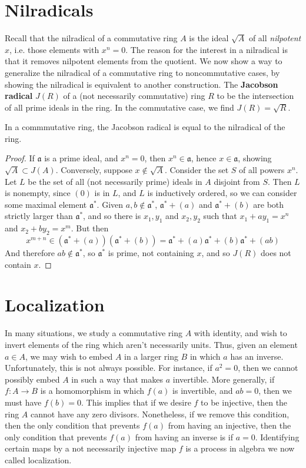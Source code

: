 \section{Nilradicals}

Recall that the nilradical of a commutative ring $A$ is the ideal $\sqrt{A}$ of all {\it nilpotent} $x$, i.e. those elements with $x^n = 0$. The reason for the interest in a nilradical is that it removes nilpotent elements from the quotient. We now show a way to generalize the nilradical of a commutative ring to noncommutative cases, by showing the nilradical is equivalent to another construction. The {\bf Jacobson radical} $J(R)$ of a (not necessarily commutative) ring $R$ to be the intersection of all prime ideals in the ring. In the commutative case, we find $J(R) = \sqrt{R}$.

\begin{theorem}
    In a commmutative ring, the Jacobson radical is equal to the nilradical of the ring.
\end{theorem}
\begin{proof}
    If $\mathfrak{a}$ is a prime ideal, and $x^n = 0$, then $x^n \in \mathfrak{a}$, hence $x \in \mathfrak{a}$, showing $\sqrt{A} \subset J(A)$. Conversely, suppose $x \not \in \sqrt{A}$. Consider the set $S$ of all powers $x^n$. Let $L$ be the set of all (not necessarily prime) ideals in $A$ disjoint from $S$. Then $L$ is nonempty, since $(0)$ is in $L$, and $L$ is inductively ordered, so we can consider some maximal element $\mathfrak{a}^*$. Given $a,b \not \in \mathfrak{a}^*$, $\mathfrak{a}^* + (a)$ and $\mathfrak{a}^* + (b)$ are both strictly larger than $\mathfrak{a}^*$, and so there is $x_1,y_1$ and $x_2,y_2$ such that $x_1 + ay_1 = x^n$ and $x_2 + by_2 = x^m$. But then
    \[ x^{m+n} \in (\mathfrak{a}^* + (a))(\mathfrak{a}^* + (b)) = \mathfrak{a}^* + (a) \mathfrak{a}^* + (b) \mathfrak{a}^* + (ab) \]
    And therefore $ab \not \in \mathfrak{a}^*$, so $\mathfrak{a}^*$ is prime, not containing $x$, and so $J(R)$ does not contain $x$.
\end{proof}

\section{Localization}

In many situations, we study a commutative ring $A$ with identity, and wish to invert elements of the ring which aren't necessarily units. Thus, given an element $a \in A$, we may wish to embed $A$ in a larger ring $B$ in which $a$ has an inverse. Unfortunately, this is not always possible. For instance, if $a^2 = 0$, then we cannot possibly embed $A$ in such a way that makes $a$ invertible. More generally, if $f:A \to B$ is a homomorphism in which $f(a)$ is invertible, and $ab = 0$, then we must have $f(b) = 0$. This implies that if we desire $f$ to be injective, then the ring $A$ cannot have any zero divisors. Nonetheless, if we remove this condition, then the only condition that prevents $f(a)$ from having an injective, then the only condition that prevents $f(a)$ from having an inverse is if $a = 0$. Identifying certain maps by a not necessarily injective map $f$ is a process in algebra we now called localization.

